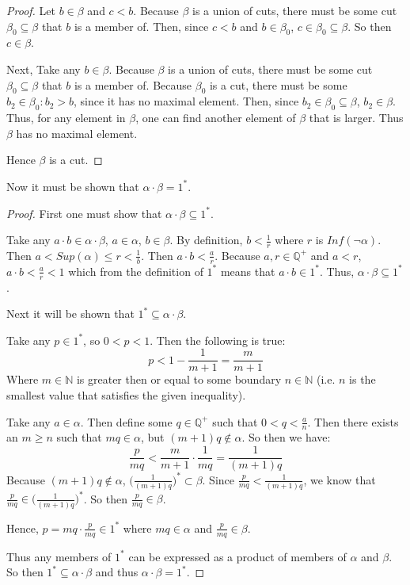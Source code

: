 \documentclass[12pt, letterpaper]{article}
\begin{document}
\begin{proof}
  \noindent Let $b \in \beta$ and $c < b$. Because $\beta$ is a union of cuts, there must be some cut $\beta_0 \subseteq \beta$ that $b$ is a member of.
  Then, since $c < b$ and $b \in \beta_0$, $c \in \beta_0 \subseteq \beta$. So then $c \in \beta$.

  \noindent Next, Take any $b \in \beta$. Because $\beta$ is a union of cuts, there must be some cut $\beta_0 \subseteq \beta$ that $b$ is a member of.
  Because $\beta_0$ is a cut, there must be some $b_2 \in \beta_0 : b_2 > b$, since it has no maximal element. Then, since $b_2 \in \beta_0 \subseteq \beta$, $b_2 \in \beta$.
  Thus, for any element in $\beta$, one can find another element of $\beta$ that is larger. Thus $\beta$ has no maximal element.

  \noindent Hence $\beta$ is a cut.
\end{proof}
\pagebreak
\noindent Now it must be shown that $\alpha \cdot \beta = 1^*$.
\begin{proof}

  First one must show that $\alpha \cdot \beta \subseteq 1^*$.

  \noindent Take any $a \cdot b \in \alpha \cdot \beta$, $a \in \alpha$, $b \in \beta$. By definition, $b < \frac{1}{r}$ where $r$ is $Inf(\neg \alpha)$.
  Then $a < Sup(\alpha) \leq r < \frac{1}{b}$. Then $a \cdot b < \frac{a}{r}$. Because $a, r \in \mathbb{Q}^+$ and $a < r$, $a \cdot b < \frac{a}{r} < 1$
   which from the definition of $1^*$ means that $a \cdot b \in 1^*$. Thus, $\alpha \cdot \beta \subseteq 1^*$.

   \noindent Next it will be shown that $1^* \subseteq \alpha \cdot \beta$.

   \noindent Take any $p \in 1^*$, so $0 < p < 1$. Then the following is true:
   $$ p < 1 - \frac{1}{m + 1} = \frac{m}{m + 1}$$
   Where $m \in \mathbb{N}$ is greater then or equal to some boundary $n \in \mathbb{N}$ (i.e. $n$ is the smallest value that satisfies the given inequality).

   \noindent Take any $a \in \alpha$. Then define some $q \in \mathbb{Q^+}$ such that $0< q < \frac{a}{n}$.
   Then there exists an $m \geq n$ such that $mq \in \alpha$, but $(m + 1)q \notin \alpha$. So then we have:
   $$ \frac{p}{mq} < \frac{m}{m + 1} \cdot \frac {1}{mq} = \frac{1}{(m + 1)q}$$
   Because $(m + 1)q \notin \alpha$, $\big(\frac{1}{(m + 1)q}\big)^* \subset \beta$.
   Since $\frac{p}{mq} < \frac{1}{(m + 1)q}$, we know that $\frac{p}{mq} \in \big(\frac{1}{(m + 1)q}\big)^*$. So then $\frac{p}{mq} \in \beta$.

   \noindent Hence, $p = mq \cdot \frac{p}{mq} \in 1^*$ where $mq \in \alpha$ and $\frac{p}{mq} \in \beta$.

   \noindent Thus any members of $1^*$ can be expressed as a product of members of $\alpha$ and $\beta$.
   So then $1^* \subseteq \alpha \cdot \beta$ and thus $\alpha \cdot \beta = 1^*$.

\end{proof}
\pagebreak
\end{document}
